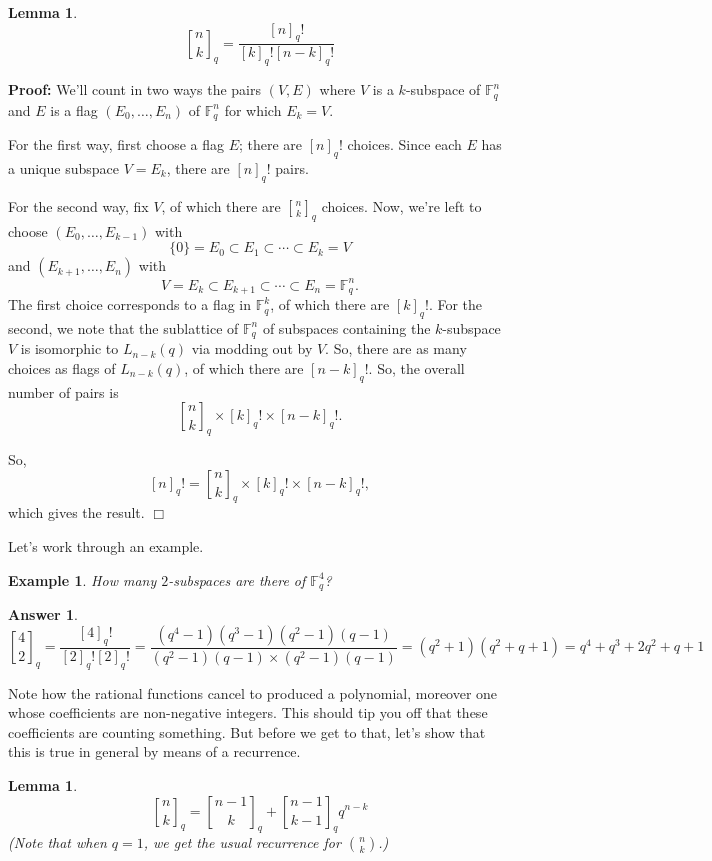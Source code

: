 \documentclass[11pt]{article}
\newtheorem{lemma}[theorem]{Lemma}
\newtheorem{answer}[theorem]{Answer}
\newtheorem{example}[theorem]{Example}
\newenvironment{proof}{\noindent \textbf{Proof:}}{$\Box$}
\newcommand{\F}{\mathbb F} %
\newcommand{\qbinom}[2] {{#1 \brack #2}_q}
\begin{document}
\begin{lemma} $$\qbinom{n}{k}=\frac{[n]_q!}{[k]_q![n-k]_q!}$$
\end{lemma}
\begin{proof}
We'll count in two ways the pairs $(V,E)$ where $V$ is a $k$-subspace of $\F_q^n$ and $E$ is a flag $(E_0, \dots, E_n)$ of $\F_q^n$ for which $E_k=V$.

For the first way, first choose a flag $E$; there are $[n]_q!$ choices. Since each $E$ has a unique subspace $V=E_k$, there are $[n]_q!$ pairs.

For the second way, fix $V$, of which there are $\qbinom{n}{k}$ choices. Now, we're left to choose $(E_0, \dots, E_{k-1})$ with  $$\{0\} = E_0 \subset E_1 \subset \cdots \subset E_k = V$$ and $(E_{k+1}, \dots, E_{n})$ with  $$V = E_k \subset E_{k+1} \subset \cdots \subset E_n = \F_q^n.$$ The first choice corresponds to a flag in $\F_q^k$, of which there are $[k]_q!$. For the second, we note that the sublattice of $\F_q^n$ of subspaces containing the $k$-subspace $V$ is isomorphic to $L_{n-k}(q)$ via modding out by $V$. So, there are as many choices as flags of $L_{n-k}(q)$, of which there are $[n-k]_q!$. So, the overall number of pairs is $$\qbinom{n}{k} \times [k]_q! \times [n-k]_q!.$$ 

So, $$[n]_q! = \qbinom{n}{k} \times [k]_q! \times [n-k]_q!,$$ which gives the result.
\end{proof}

Let's work through an example.

\begin{example} How many $2$-subspaces are there of $\F_q^4$?
\end{example}

\begin{answer} $$\qbinom{4}{2} = \frac{[4]_q!}{[2]_q![2]_q!} = \frac{(q^4-1)(q^3-1)(q^2-1)(q-1)}{(q^2-1)(q-1)\times (q^2-1)(q-1)} = (q^2+1)(q^2+q+1) = q^4+q^3+2q^2+q+1$$ 
\end{answer}

Note how the rational functions cancel to produced a polynomial, moreover one whose coefficients are non-negative integers. This should tip you off that these coefficients are counting something. But before we get to that, let's show that this is true in general by means of a recurrence.

\begin{lemma}
$$\qbinom{n}{k} = \qbinom{n-1}{k} +  \qbinom{n-1}{k-1} q^{n-k} $$ (Note that when $q=1$, we get the usual recurrence for $\binom{n}{k}$.)
\end{lemma}
\end{document}
